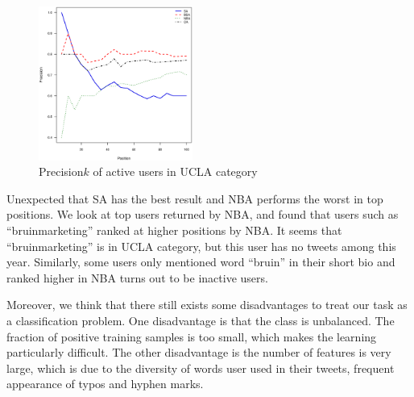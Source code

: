 \documentclass{article}
\begin{document}
\begin{figure}[htbp]
\centering
\includegraphics[width=0.45\textwidth]{experiment/ap.eps}
\caption{Precision\at$k$ of active users in UCLA category}
\label{fig:activeprecision}
\end{figure}

Unexpected that SA has the best result and NBA performs the worst in top positions. We look at top users returned by NBA, and found that users such as ``bruinmarketing'' ranked at higher positions by NBA. It seems that ``bruinmarketing'' is in UCLA category, but this user has no tweets among this year. Similarly, some users only mentioned word ``bruin'' in their short bio and ranked higher in NBA turns out to be inactive users.

Moreover, we think that there still exists some disadvantages to treat our task as a classification problem. One disadvantage is that the class is unbalanced. The fraction of positive training samples is too small, which makes the learning particularly difficult. The other disadvantage is the number of features is very large, which is due to the diversity of words user used in their tweets, frequent appearance of typos and hyphen marks.

\ifx \allfiles \undefined
\end{document}
